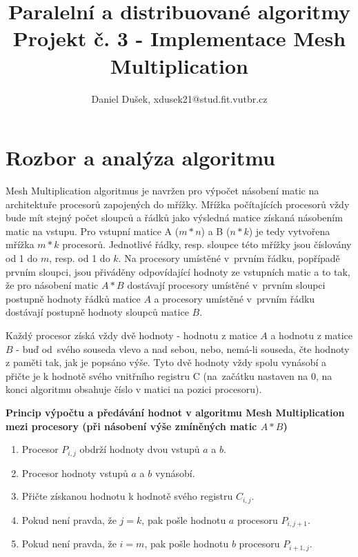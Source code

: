 \documentclass[a4paper,10pt]{article}
\title{Paralelní a distribuované algoritmy \\Projekt č. 3 \-- Implementace Mesh Multiplication}
\author{Daniel Dušek, xdusek21@stud.fit.vutbr.cz}
\begin{document}
    \maketitle

	\section{Rozbor a analýza algoritmu}
	\par Mesh Multiplication algoritmus je navržen pro výpočet násobení matic na architektuře procesorů zapojených do mřížky. Mřížka počítajících procesorů vždy bude mít stejný počet sloupců a řádků jako výsledná matice získaná násobením matic na vstupu. Pro vstupní matice A ($m*n$) a B ($n*k$) je tedy vytvořena mřížka $m*k$ procesorů. Jednotlivé řádky, resp. sloupce této mřížky jsou číslovány od 1 do $m$, resp. od 1 do $k$. Na procesory umístěné v~prvním řádku, popřípadě prvním sloupci, jsou přiváděny odpovídající hodnoty ze vstupních matic a to tak, že pro násobení matic $A*B$ dostávají procesory umístěné v~prvním sloupci postupně hodnoty řádků matice $A$ a procesory umístěné v~prvním řádku dostávají postupně hodnoty sloupců matice $B$.

	\par Každý procesor získá vždy dvě hodnoty \-- hodnotu z matice $A$ a hodnotu z matice $B$ \-- buď od~svého souseda vlevo a nad sebou, nebo, nemá-li souseda, čte hodnoty z paměti tak, jak je popsáno výše. Tyto dvě hodnoty vždy spolu vynásobí a přičte je k hodnotě svého vnitřního registru C (na~začátku nastaven na 0, na konci algoritmu obsahuje číslo v matici na pozici procesoru).

	\hspace{0.2cm}

	\textbf{Princip výpočtu a předávání hodnot v algoritmu Mesh Multiplication mezi procesory (při násobení výše zmíněných matic $A*B$)}

	\begin{enumerate}
		\item Procesor $P_{i,j}$ obdrží hodnoty dvou vstupů $a$ a $b$.
		\item Procesor hodnoty vstupů $a$ a $b$ vynásobí.
		\item Přičte získanou hodnotu k hodnotě svého registru $C_{i,j}$.
		\item Pokud není pravda, že $j = k$, pak pošle hodnotu $a$ procesoru $P_{i,j+1}$.
		\item Pokud není pravda, že $i = m$, pak pošle hodnotu $b$ procesoru $P_{i+1,j}$.
	\end{enumerate}
\end{document}
